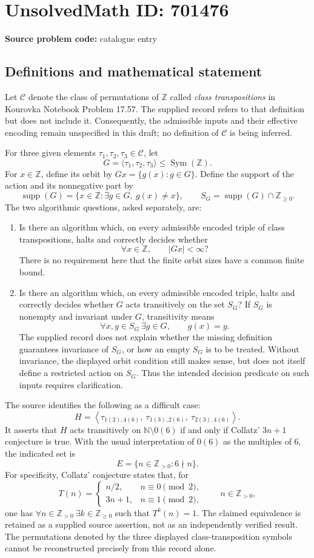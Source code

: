 \documentclass[11pt]{article}
\newcommand{\N}{\mathbb{N}}
\newcommand{\Z}{\mathbb{Z}}
\begin{document}
\section*{UnsolvedMath ID: 701476}
\textbf{Source problem code:} catalogue entry
\subsection{Definitions and mathematical statement}
Let \(\mathcal C\) denote the class of permutations of \(\Z\) called \emph{class transpositions} in Kourovka Notebook Problem 17.57. The supplied record refers to that definition but does not include it. Consequently, the admissible inputs and their effective encoding remain unspecified in this draft; no definition of \(\mathcal C\) is being inferred.

For three given elements \(\tau_1,\tau_2,\tau_3\in\mathcal C\), let
\[
G=\langle\tau_1,\tau_2,\tau_3\rangle\leq\operatorname{Sym}(\Z).
\]
For \(x\in\Z\), define its orbit by \(Gx=\{g(x):g\in G\}\). Define the support of the action and its nonnegative part by
\[
\operatorname{supp}(G)=\{x\in\Z:\exists g\in G,\ g(x)\neq x\},
\qquad
S_G=\operatorname{supp}(G)\cap\Z_{\geq0}.
\]
The two algorithmic questions, asked separately, are:
\begin{enumerate}
\item[(a)] Is there an algorithm which, on every admissible encoded triple of class transpositions, halts and correctly decides whether
\[
\forall x\in\Z,\qquad |Gx|<\infty?
\]
There is no requirement here that the finite orbit sizes have a common finite bound.
\item[(b)] Is there an algorithm which, on every admissible encoded triple, halts and correctly decides whether \(G\) acts transitively on the set \(S_G\)? If \(S_G\) is nonempty and invariant under \(G\), transitivity means
\[
\forall x,y\in S_G\ \exists g\in G,\qquad g(x)=y.
\]
The supplied record does not explain whether the missing definition guarantees invariance of \(S_G\), or how an empty \(S_G\) is to be treated. Without invariance, the displayed orbit condition still makes sense, but does not itself define a restricted action on \(S_G\). Thus the intended decision predicate on such inputs requires clarification.
\end{enumerate}

The source identifies the following as a difficult case:
\[
H=\left\langle
\tau_{1(2),4(6)},\
\tau_{1(3),2(6)},\
\tau_{2(3),4(6)}
\right\rangle.
\]
It asserts that \(H\) acts transitively on \(\N\setminus0(6)\) if and only if Collatz' \(3n+1\) conjecture is true. With the usual interpretation of \(0(6)\) as the multiples of \(6\), the indicated set is
\[
E=\{n\in\Z_{>0}:6\nmid n\}.
\]
For specificity, Collatz' conjecture states that, for
\[
T(n)=\begin{cases}
n/2,&n\equiv0\pmod2,\\
3n+1,&n\equiv1\pmod2,
\end{cases}
\qquad n\in\Z_{>0},
\]
one has \(\forall n\in\Z_{>0}\ \exists k\in\Z_{\geq0}\) such that \(T^k(n)=1\). The claimed equivalence is retained as a supplied source assertion, not as an independently verified result. The permutations denoted by the three displayed class-transposition symbols cannot be reconstructed precisely from this record alone.
\end{document}

